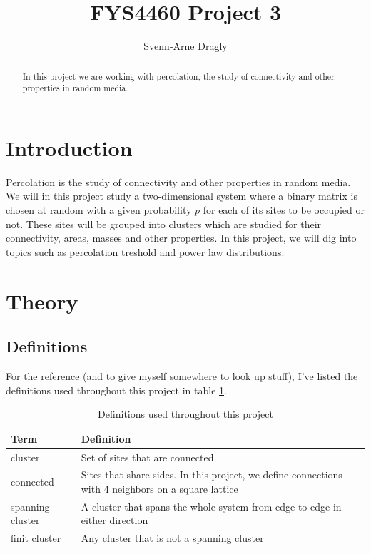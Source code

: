 \documentclass[a4paper,reprint,floatfix,amsmath,amssymb,aps,pra]{revtex4-1}
\begin{document}
\title{FYS4460 Project 3}
\author{Svenn-Arne Dragly}

\begin{abstract}
In this project we are working with percolation, the study of connectivity and other properties in random media.
\end{abstract}

\maketitle

\section{Introduction}

Percolation is the study of connectivity and other properties in random media. We will in this project study a two-dimensional system where a binary matrix is chosen at random with a given probability $p$ for each of its sites to be occupied or not. These sites will be grouped into clusters which are studied for their connectivity, areas, masses and other properties. In this project, we will dig into topics such as percolation treshold and power law distributions.

\section{Theory}

\subsection{Definitions}

For the reference (and to give myself somewhere to look up stuff), I've listed the definitions used throughout this project in table \ref{tab:definitions}.
\begingroup
\begin{table}[h]
\begin{ruledtabular}
\begin{tabular}{l p{}}
Term       &                  Definition \\
\hline
cluster & Set of sites that are connected \\
connected & Sites that share sides. In this project, we define connections with 4 neighbors on a square lattice \\
spanning cluster & A cluster that spans the whole system from edge to edge in either direction \\
finit cluster & Any cluster that is not a spanning cluster \\
\end{tabular}
\end{ruledtabular}
\caption{Definitions used throughout this project}
\label{tab:definitions}
\end{table}
\endgroup
\end{document}
